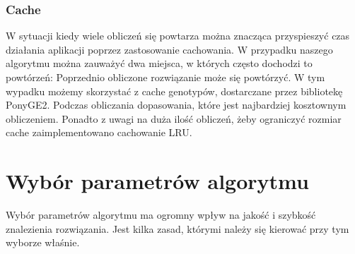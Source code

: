 \subsubsection{Cache}

W sytuacji kiedy wiele obliczeń się powtarza można znacząca przyspieszyć czas działania aplikacji poprzez zastosowanie cachowania. W przypadku naszego algorytmu można zauważyć dwa miejsca, w których często dochodzi to powtórzeń:
Poprzednio obliczone rozwiązanie może się powtórzyć. W tym wypadku możemy skorzystać z cache genotypów, dostarczane przez bibliotekę PonyGE2.
Podczas obliczania dopasowania, które jest najbardziej kosztownym obliczeniem. Ponadto z uwagi na duża ilość obliczeń, żeby ograniczyć rozmiar cache zaimplementowano cachowanie LRU.
\section{Wybór parametrów algorytmu}
Wybór parametrów algorytmu ma ogromny wpływ na jakość i szybkość znalezienia rozwiązania. Jest kilka zasad, którymi należy się kierować przy tym wyborze właśnie.

